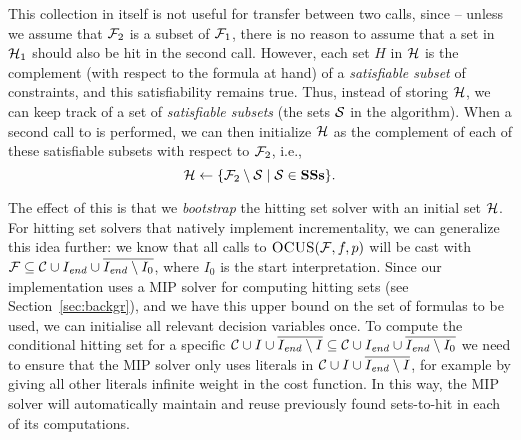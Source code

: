 This collection in itself is not useful for transfer between two calls, since -- unless we assume that $\mathcal{F} _2$ is a subset of $\mathcal{F} _1$, there is no reason to assume that a set in $\mathcal{H}_1$ should also be hit in the second call. 
However, each set $H$ in $\mathcal{H}$ is the complement (with respect to the formula at hand) of a \emph{satisfiable subset} of constraints, and this satisfiability remains true. 
Thus, instead of storing $\mathcal{H}$, we can keep track of a set \satsets of \emph{satisfiable subsets} (the sets $\mathcal{S}$ in the \comus algorithm). 
When a second call to \comus is performed, we can then initialize $\mathcal{H}$ as the complement of each of these satisfiable subsets with respect to $\mathcal{F} _2$, i.e., \[\mathcal{H}\gets \{\mathcal{F} _2\setminus \mathcal{S}\mid \mathcal{S}\in \mathbf{SSs}\}.\]

The effect of this is that we \textit{bootstrap} the hitting set solver with an initial set $\mathcal{H}$. For hitting set solvers that natively implement incrementality, we can generalize this idea further: we know that all calls to $\textsc{OCUS}(\mathcal{F} ,f,p)$ will be cast with $\mathcal{F}  \subseteq \mathcal{C}\cup I_\mathit{end}  \cup \overline{I_\mathit{end}  \setminus I_0}$, where $I_0$ is the start interpretation. Since our implementation uses a MIP solver for computing hitting sets (see Section~\ref{sec:backgr}), and we have this upper bound on the set of formulas to be used, we can initialise all relevant decision variables once. To compute the conditional hitting set for a specific $\mathcal{C} \cup I\cup \overline{I_\mathit{end} \setminus I} \subseteq \mathcal{C}\cup I_\mathit{end}  \cup \overline{I_\mathit{end}  \setminus I_0}$ we need to ensure that the MIP solver only uses literals in $\mathcal{C} \cup I\cup \overline{I_\mathit{end} \setminus I}$, for example by giving all other literals infinite weight in the cost function. In this way, the MIP solver will automatically maintain and reuse previously found sets-to-hit in each of its computations. 




